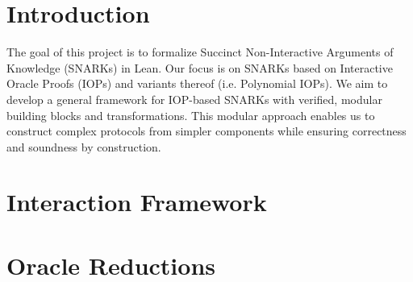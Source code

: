 %

\chapter{Introduction}

The goal of this project is to formalize Succinct Non-Interactive Arguments of Knowledge (SNARKs) in
Lean. Our focus is on SNARKs based on Interactive Oracle Proofs (IOPs) and variants thereof (i.e.
Polynomial IOPs). We aim to develop a general framework for IOP-based SNARKs with verified, modular
building blocks and transformations. This modular approach enables us to construct complex protocols
from simpler components while ensuring correctness and soundness by construction.

\chapter{Interaction Framework}\label{chap:interaction}

















\chapter{Oracle Reductions}\label{chap:oracle_reductions}



